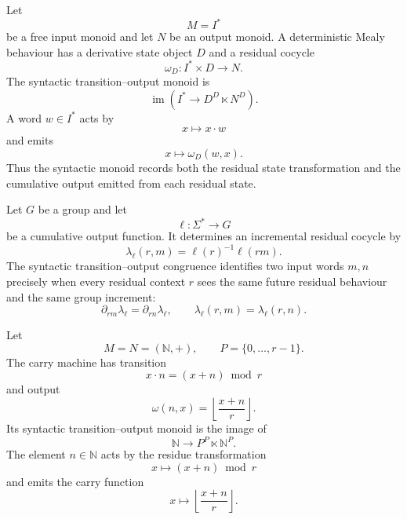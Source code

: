 \begin{example}
\label{ex:syn-to-deterministic-mealy-machines}
    Let
    \[
        M=I^\ast
    \]
    be a free input monoid and let \(N\) be an output monoid. A deterministic
    Mealy behaviour has a derivative state object \(D\) and a residual cocycle
    \[
        \omega_D:I^\ast\times D\to N.
    \]
    The syntactic transition--output monoid is
    \[
        \operatorname{im}
        \left(
            I^\ast\to D^D\ltimes N^D
        \right).
    \]
    A word \(w\in I^\ast\) acts by
    \[
        x\longmapsto x\cdot w
    \]
    and emits
    \[
        x\longmapsto \omega_D(w,x).
    \]
    Thus the syntactic monoid records both the residual state transformation and
    the cumulative output emitted from each residual state.
\end{example}

\begin{example}
\label{ex:syn-to-group-valued-cumulative-outputs}
    Let \(G\) be a group and let
    \[
        \ell:\Sigma^\ast\to G
    \]
    be a cumulative output function. It determines an incremental residual
    cocycle by
    \[
        \lambda_\ell(r,m)=\ell(r)^{-1}\ell(rm).
    \]
    The syntactic transition--output congruence identifies two input words
    \(m,n\) precisely when every residual context \(r\) sees the same future
    residual behaviour and the same group increment:
    \[
        \partial_{rm}\lambda_\ell=\partial_{rn}\lambda_\ell,
        \qquad
        \lambda_\ell(r,m)=\lambda_\ell(r,n).
    \]
\end{example}

\begin{example}
\label{ex:syn-to-base-r-carry-machine}
    Let
    \[
        M=N=(\mathbb N,+),
        \qquad
        P=\{0,\dots,r-1\}.
    \]
    The carry machine has transition
    \[
        x\cdot n=(x+n)\bmod r
    \]
    and output
    \[
        \omega(n,x)=
        \left\lfloor\frac{x+n}{r}\right\rfloor.
    \]
    Its syntactic transition--output monoid is the image of
    \[
        \mathbb N\to P^P\ltimes\mathbb N^P.
    \]
    The element \(n\in\mathbb N\) acts by the residue transformation
    \[
        x\longmapsto (x+n)\bmod r
    \]
    and emits the carry function
    \[
        x\longmapsto
        \left\lfloor\frac{x+n}{r}\right\rfloor.
    \]
\end{example}

